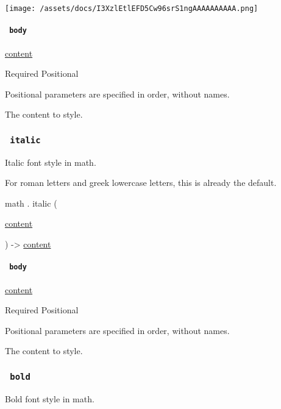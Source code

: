 \texttt{[image: /assets/docs/I3XzlEtlEFD5Cw96srS1ngAAAAAAAAAA.png]}

\paragraph{\texorpdfstring{\texttt{\ body\ }}{ body }}\label{functions-upright-body}

\href{/docs/reference/foundations/content/}{content}

{Required} {{ Positional }}

\label{functions-upright-body-positional-tooltip}
Positional parameters are specified in order, without names.

The content to style.

\subsubsection{\texorpdfstring{\texttt{\ italic\ }}{ italic }}\label{functions-italic}

Italic font style in math.

For roman letters and greek lowercase letters, this is already the
default.

math { . } { italic } (

{ \href{/docs/reference/foundations/content/}{content} }

) -\textgreater{} \href{/docs/reference/foundations/content/}{content}

\paragraph{\texorpdfstring{\texttt{\ body\ }}{ body }}\label{functions-italic-body}

\href{/docs/reference/foundations/content/}{content}

{Required} {{ Positional }}

\label{functions-italic-body-positional-tooltip}
Positional parameters are specified in order, without names.

The content to style.

\subsubsection{\texorpdfstring{\texttt{\ bold\ }}{ bold }}\label{functions-bold}

Bold font style in math.

